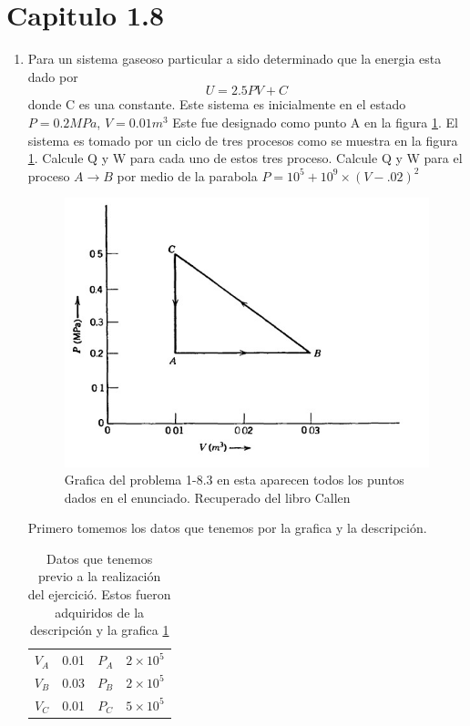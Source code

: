 \documentclass[12pt]{exam}
\begin{document}
\section{Capitulo 1.8}
\begin{enumerate}
	\item Para un sistema gaseoso particular a sido determinado que la energia esta dado por $$U = 2.5PV + C$$ donde C es una constante. Este sistema es inicialmente en el estado $P = 0.2 MPa$, $V=0.01 m^3$ Este fue designado como punto A en la figura \ref{fig:Imagen183}. El sistema es tomado por un ciclo de tres procesos como se muestra en la figura \ref{fig:Imagen183}. Calcule Q y W para cada uno de estos tres proceso. Calcule Q y W para el proceso $A\to B$ por medio de la parabola $P=10^5 + 10^9 \times (V - .02)^2$
		\begin{figure}[h]
			\centering
			\includegraphics[scale=0.5]{Imagen183.jpeg}
			\caption{Grafica del problema 1-8.3 en esta aparecen todos los puntos dados en el enunciado. Recuperado del libro Callen}
			\label{fig:Imagen183}
		\end{figure}
		
		Primero tomemos los datos que tenemos por la grafica y la descripción.
		\begin{table}[h]
			\centering
			\caption{Datos que tenemos previo a la realización del ejercició. Estos fueron adquiridos de la descripción y la grafica \ref{fig:Imagen183}}
			\label{table:Datos}
			\begin{tabular}{|c|c|c|c|}
				\hline
				$V_A$ & 0.01 & $P_A$ & $2\times 10^5$ \\
				$V_B$ & 0.03 & $P_B$ & $2\times 10^5$ \\
				$V_C$ & 0.01 & $P_C$ & $5\times 10^5$ \\
				\hline
			\end{tabular}
		\end{table}


\end{enumerate}
\end{document}
